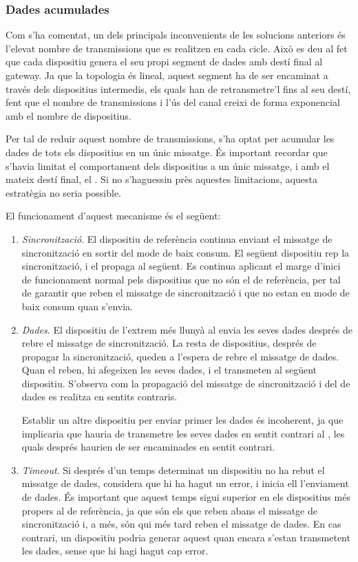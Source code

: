 \documentclass{tfgitic}[2024/07/01]
\begin{document}
{\subsubsection{Dades acumulades}
Com s’ha comentat, un dels principals inconvenients de les solucions anteriors és l’elevat nombre de transmissions que es realitzen en cada cicle. Això es deu al fet que cada dispositiu genera el seu propi segment de dades amb destí final al gateway. Ja que la topologia és lineal, aquest segment ha de ser encaminat a través dels dispositius intermedis, els quals han de retransmetre’l fins al seu destí, fent que el nombre de transmissions i l'ús del canal creixi de forma exponencial amb el nombre de dispositius. 

Per tal de reduir aquest nombre de transmissions, s'ha optat per acumular les dades de tots els dispositius en un únic missatge. És important recordar que s'havia limitat el comportament dels dispositius a un únic missatge, i amb el mateix destí final, el . Si no s'haguessin près aquestes limitacions, aquesta estratègia no seria possible.

El funcionament d'aquest mecanisme és el següent:
\begin{enumerate}
    \item \emph{Sincronització}. El dispositiu de referència continua enviant el missatge de sincronització en sortir del mode de baix consum. El següent dispositiu rep la sincronització, i el propaga al següent. Es continua aplicant el marge d'inici de funcionament normal pels dispositius que no són el de referència, per tal de garantir que reben el missatge de sincronització i que no estan en mode de baix consum quan s'envia.
    \item \emph{Dades}. El dispositiu de l'extrem més llunyà al  envia les seves dades després de rebre el missatge de sincronització. La resta de dispositius, després de propagar la sincronització, queden a l'espera de rebre el missatge de dades. Quan el reben, hi afegeixen les seves dades, i el transmeten al següent dispositiu. S'observa com la propagació del missatge de sincronització i del de dades es realitza en sentits contraris.
    
    Establir un altre dispositiu per enviar primer les dades és incoherent, ja que implicaria que hauria de transmetre les seves dades en sentit contrari al , les quals després haurien de ser encaminades en sentit contrari.

    \item \emph{Timeout}. Si després d'un temps determinat un dispositiu no ha rebut el missatge de dades, considera que hi ha hagut un error, i inicia ell l'enviament de dades. És important que aquest temps sigui superior en els dispositius més propers al de referència, ja que són els que reben abans el missatge de sincronització i, a més, són qui més tard reben el missatge de dades. En cas contrari, un dispositiu podria generar aquest  quan encara s'estan transmetent les dades, sense que hi hagi hagut cap error. 


\end{enumerate}}
\end{document}
